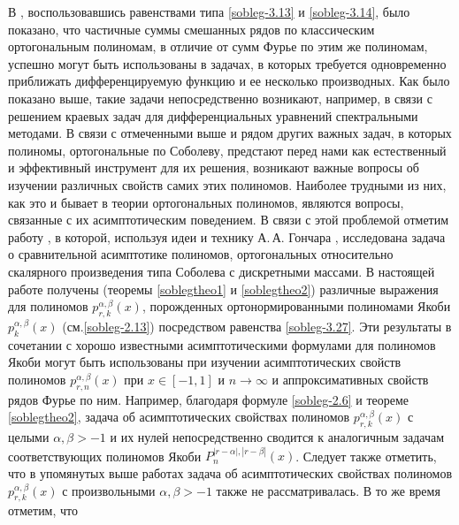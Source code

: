 В  \cite{sobleg-Shar11, sobleg-Shar12, sobleg-Shar13, sobleg-Shar15, sobleg-Shar16, sobleg-Shar17, sobleg-Shar18, sobleg-sharap3, sobleg-SHII}, воспользовавшись равенствами типа \eqref{sobleg-3.13} и \eqref{sobleg-3.14}, было показано, что частичные суммы смешанных рядов по классическим ортогональным полиномам, в отличие от сумм Фурье по этим же полиномам, успешно могут быть использованы в задачах, в которых требуется одновременно приближать дифференцируемую функцию и ее несколько производных. Как было показано выше, такие задачи непосредственно возникают, например, в связи с решением краевых задач для дифференциальных уравнений спектральными методами.
В связи с отмеченными выше и рядом других важных задач, в которых полиномы, ортогональные по Соболеву, предстают перед нами как естественный и эффективный инструмент для их решения, возникают важные вопросы об изучении различных  свойств самих этих полиномов. Наиболее трудными из них, как это и бывает в теории ортогональных полиномов, являются вопросы, связанные с их асимптотическим поведением.   В связи с этой проблемой  отметим  работу
\cite{sobleg-Lopez1995}, в которой, используя  идеи и технику А.\,А. Гончара \cite{sobleg-Gonchar1975}, исследована задача о сравнительной асимптотике полиномов, ортогональных относительно скалярного произведения типа  Соболева с дискретными массами.
В настоящей  работе получены (теоремы \ref{soblegtheo1} и \ref{soblegtheo2}) различные выражения для полиномов $p_{r,k}^{\alpha,\beta}(x)$, порожденных ортонормированными полиномами Якоби $p_{k}^{\alpha,\beta}(x)$ (см.\eqref{sobleg-2.13}) посредством  равенства \eqref{sobleg-3.27}. Эти результаты в сочетании с  хорошо известными асимптотическими формулами для полиномов Якоби могут быть использованы  при изучении асимптотических свойств полиномов $p_{r,n}^{\alpha,\beta}(x)$ при $x\in[-1,1]$ и $n\to\infty$ и аппроксимативных свойств рядов Фурье по ним. Например,  благодаря формуле \eqref{sobleg-2.6}  и теореме \ref{soblegtheo2}, задача об асимптотических свойствах полиномов $p_{r,k}^{\alpha,\beta}(x)$ с целыми $\alpha,\beta>-1$ и их нулей непосредственно сводится к аналогичным задачам соответствующих полиномов Якоби $P_n^{|r-\alpha|,|r-\beta|}(x)$.  %
Следует также отметить, что в упомянутых выше работах \cite{sobleg-Shar11, sobleg-Shar12, sobleg-Shar13, sobleg-Shar15, sobleg-Shar16, sobleg-Shar17, sobleg-Shar18, sobleg-sharap3, sobleg-SHII} задача об асимптотических свойствах полиномов $p_{r,k}^{\alpha,\beta}(x)$ с произвольными $\alpha,\beta>-1$ также не рассматривалась. В то же время отметим, что
